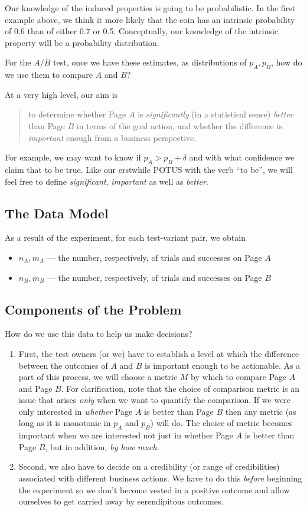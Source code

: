 \documentclass[12pt]{report}
\newcommand{\be}{\begin{enumerate}} %
\newcommand{\ee}{\end{enumerate}} %
\newcommand{\bi}{\begin{itemize}} %
\newcommand{\ei}{\end{itemize}} %
\begin{document}
Our knowledge of the induced properties is going to be
probabilistic. In the first example above, we think it more likely
that the coin has an intrinsic probability of 0.6 than of either 0.7
or 0.5. Conceptually, our knowledge of the intrinsic property will be
a probability distribution.

For the \(A/B\) test, once we have these estimates, as distributions
of \(p_A, p_B\), how do we use them to compare \(A\) and \(B\)?

At a very high level, our aim is
\begin{quote}
  to determine whether Page \(A\) is {\em significantly} (in a statistical
  sense) {\em better} than Page \(B\) in terms of the goal action, and
  whether the difference is {\em important} enough from a business
  perspective.
\end{quote}
For example, we may want to
know if \(p_A > p_B + \delta\) and with what confidence we claim that
to be true. Like our erstwhile POTUS with the verb ``to be'',
we will feel free to
define {\em significant}, {\em important} as well as {\em better}. 

\subsection{The Data Model}
As a result of the experiment, for each test-variant pair, we obtain
\bi
\item \(n_A, m_A\) --- the number, respectively, of trials and
  successes on Page \(A\)
\item \(n_B, m_B\) --- the number, respectively, of trials and
  successes  on Page \(B\)
\ei

\subsection{Components of the Problem}
How do we use this data to help us make decisions?
\be
\item First, the test owners (or we) have to establish a level at
  which the difference between the outcomes of \(A\) and \(B\) is
  important enough to be actionable. As a part of this process, we will choose a
  metric \(M\) by which to compare Page \(A\) and Page \(B\). For clarification, note that the choice of comparison metric is an issue that
  arises {\em only} when we want to quantify the comparison. If we
  were only interested in {\em whether} Page \(A\) is better than Page
  \(B\) then any metric (as long as it is monotonic in \(p_A\) and
  \(p_B\)) will do. The choice of metric becomes important when we are
  interested not just in whether Page \(A\) is better than Page \(B\),
  but in addition, {\em by how much}.
\item Second, we also have to decide on a credibility (or range of
  credibilities) associated with different business actions. We have
  to do this {\em before} beginning the experiment so we don't become
  vested in a positive outcome and allow ourselves to get carried away
  by serendipitous outcomes.
\ee
\end{document}
